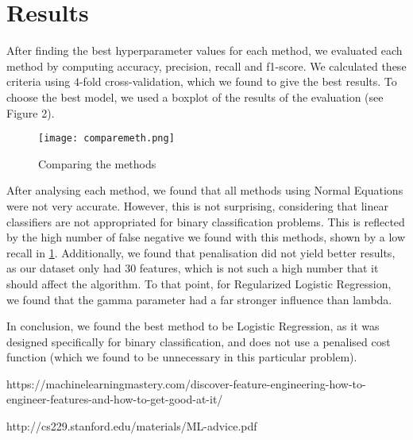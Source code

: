 \documentclass{article}
\begin{document}
	\section{Results}
	After finding the best hyperparameter values for each method, we evaluated each method by computing accuracy, precision, recall and f1-score. We calculated these criteria using $4$-fold cross-validation, which we found to give the best results. To choose the best model, we used a boxplot of the results of the evaluation (see Figure 2).

	\begin{figure}[h]
		\centering
		\texttt{[image: comparemeth.png]}
		\caption{Comparing the methods}\label{boxplot}
	\end{figure}

	After analysing each method, we found that all methods using Normal Equations were not very accurate. However, this is not surprising, considering that linear classifiers are not appropriated for binary classification problems. This is reflected by the high number of false negative we found with this methods, shown by a low recall in \ref{boxplot}.
	Additionally, we found that penalisation did not yield better results, as our dataset only had $30$ features, which is not such a high number that it should affect the algorithm. To that point, for Regularized Logistic Regression, we found that the gamma parameter had a far stronger influence than lambda.

	In conclusion, we found the best method to be Logistic Regression, as it was designed specifically for binary classification, and does not use a penalised cost function (which we found to be unnecessary in this particular problem).

	\begin{thebibliography}{9}
		 https://machinelearningmastery.com/discover-feature-engineering-how-to-engineer-features-and-how-to-get-good-at-it/

		 http://cs229.stanford.edu/materials/ML-advice.pdf
	\end{thebibliography}
\end{document}
